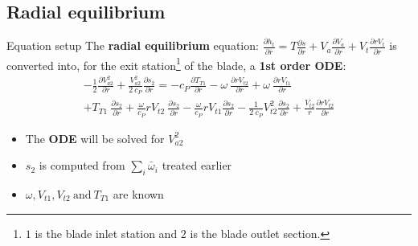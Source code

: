 \subsection{Radial equilibrium}
	\begin{frame}{Equation setup}
		The \textbf{radial equilibrium} equation: $\frac{\partial h_t}{\partial r} = T \frac{\partial s}{\partial r} + V_a \frac{\partial V_a}{\partial r} + V_t \frac{\partial r V_t}{\partial r}$ is converted into, for the exit station\footnote{$1$ is the blade inlet station and $2$ is the blade outlet section.} of the blade, a \textbf{1st order ODE}:
		\begin{equation}
			\begin{split}
				- \frac{1}{2} \frac{\partial V_{a2}^2}{\partial r} + \frac{V_{a2}^2}{2 \ c_P} \frac{\partial s_{2}}{\partial r} = - c_P \frac{\partial T_{T1}}{\partial r} - \omega \ \frac{\partial r V_{t2}}{\partial r} + \omega \ \frac{\partial r V_{t1}}{\partial r} \\ + T_{T1} \ \frac{\partial s_2}{\partial r} + \frac{\omega}{c_P} r V_{t2} \ \frac{\partial s_2}{\partial r} - \frac{\omega}{c_P} r V_{t1} \frac{\partial s_2}{\partial r} - \frac{1}{2 \ c_P} V_{t2}^2 \frac{\partial s_2}{\partial r} + \frac{V_{t2}}{r} \frac{\partial r V_{t2}}{\partial r}	
			\nonumber
			\end{split}
		\end{equation}
		\begin{itemize}
			\item The \textbf{ODE} will be solved for $V_{a2}^2$ 
			\item $s_2$ is computed from $\sum_i \bar{\omega}_{i}$ treated earlier 
			\item $\omega, V_{t1}, V_{t2} \ \text{and} \ T_{T1}$ are known
		\end{itemize}
	\end{frame}
	
